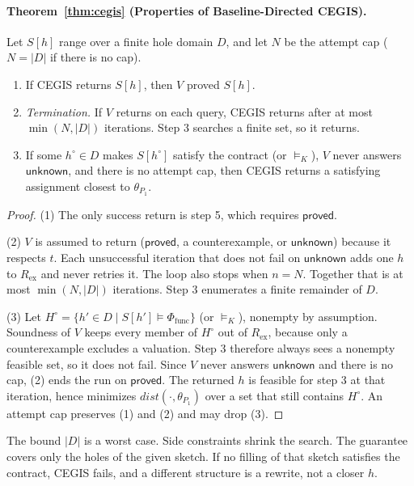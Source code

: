 \paragraph{Theorem~\ref{thm:cegis} (Properties of Baseline-Directed CEGIS).}
Let \(S[h]\) range over a finite hole domain \(D\), and let \(N\) be the
attempt cap (\(N = |D|\) if there is no cap).
\begin{enumerate}
  \item If CEGIS returns \(S[h]\), then \(V\) proved \(S[h]\).
  \item \emph{Termination.} If \(V\) returns on each query, CEGIS returns
  after at most \(\min(N, |D|)\) iterations. Step 3 searches a finite set,
  so it returns.
  \item If some \(h^\circ \in D\) makes \(S[h^\circ]\) satisfy the contract
  (or \(\models_K\)), \(V\) never answers \(\mathsf{unknown}\), and there is
  no attempt cap, then CEGIS returns a satisfying assignment closest to
  \(\theta_{P_1}\).
\end{enumerate}
\begin{proof}
(1) The only success return is step 5, which requires
\(\mathsf{proved}\).

(2) \(V\) is assumed to return (\(\mathsf{proved}\), a counterexample, or
\(\mathsf{unknown}\)) because it respects \(t\). Each unsuccessful
iteration that does not fail on \(\mathsf{unknown}\) adds one \(h\) to
\(R_{\mathrm{ex}}\) and never retries it. The loop also stops when
\(n = N\). Together that is at most \(\min(N, |D|)\) iterations. Step 3
enumerates a finite remainder of \(D\).

(3) Let \(H^\circ = \{h' \in D \mid S[h'] \models \Phi_{\text{func}}\}\)
(or \(\models_K\)), nonempty by assumption. Soundness of \(V\) keeps every
member of \(H^\circ\) out of \(R_{\mathrm{ex}}\), because only a
counterexample excludes a valuation. Step 3 therefore always sees a
nonempty feasible set, so it does not fail. Since \(V\) never answers
\(\mathsf{unknown}\) and there is no cap, (2) ends the run on
\(\mathsf{proved}\). The returned \(h\) is feasible for step 3 at that
iteration, hence minimizes \(\mathit{dist}(\cdot, \theta_{P_1})\) over a
set that still contains \(H^\circ\). An attempt cap preserves (1) and (2)
and may drop (3).
\end{proof}

The bound \(|D|\) is a worst case. Side constraints shrink the search.
The guarantee covers only the holes of the given sketch. If no filling of
that sketch satisfies the contract, CEGIS fails, and a different structure
is a rewrite, not a closer \(h\).


